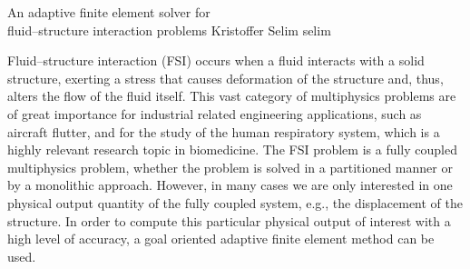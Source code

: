               {An adaptive finite element solver for \\fluid--structure interaction problems}
              {Kristoffer Selim}
              {selim}
\newcommand{\subdt}{\textrm{d}_t}
\newcommand{\divv}{\textrm{div}\;}
\newcommand{\Divv}{\textrm{Div}\;}
\newcommand{\uF}{u_{_{F}}}
\newcommand{\dotuF}{\dot{u}_{_{F}}}
\newcommand{\pF}{p_{_{F}}}
\newcommand{\rhoF}{\rho_{_{F}}}
\newcommand{\sigmaF}{\sigma_{_{F}}}
\newcommand{\sigmaFup}{\sigma_{_{F}}(u_{_{F}}, p_{_{F}})}
\newcommand{\sigmaS}{\sigma_{_{S}}}
\newcommand{\bff}{b_{_{F}}}
\newcommand{\graduF}{\textrm{grad}\;u_{_{F}}}
\newcommand{\US}{U_{_{S}}}
\newcommand{\uS}{u_{_{S}}}
\newcommand{\GradUS}{\textrm{Grad}\;U_{_{S}}}
\newcommand{\ddotUS}{\ddot{U}_{_{S}}}
\newcommand{\ddotuS}{\ddot{u}_{_{S}}}
\newcommand{\PS}{P_{_{S}}}
\newcommand{\rhoS}{\rho_{_{S}}}
\newcommand{\SigmaS}{\Sigma_{_{S}}}
\newcommand{\SigmaSU}{\Sigma_{_{S}}(U_{_{S}})}
\newcommand{\BS}{B_{_{S}}}
\newcommand{\M}{\mathcal{M}}
\newcommand{\E}{\mathcal{E}}
\newcommand{\oF}{\omega_{_{F}}}
\newcommand{\oS}{\omega_{_{S}}}
\newcommand{\OS}{\Omega_{_{S}}}
\newcommand{\OF}{\Omega_{_{F}}}
\newcommand{\PhiS}{\Phi_{_{S}}}
\newcommand{\PhiM}{\Phi_{_{M}}}
\newcommand{\FS}{F_{_{S}}}
\newcommand{\UM}{U_{_{M}}}
\newcommand{\SigmaM}{\Sigma_{_{M}}}
\newcommand{\GradUM}{\textrm{Grad}\;U_{_{M}}}
\newcommand{\UF}{U_{_{F}}}
\newcommand{\PF}{P_{_{F}}}
\newcommand{\AFF}{A_{_{FF}}}
\newcommand{\AFS}{A_{_{FS}}}
\newcommand{\AFM}{A_{_{FM}}}
\newcommand{\ASS}{A_{_{SS}}}
\newcommand{\ASF}{A_{_{SF}}}
\newcommand{\ASM}{A_{_{SM}}}
\newcommand{\AMM}{A_{_{MM}}}
\newcommand{\AMF}{A_{_{MF}}}
\newcommand{\AMS}{A_{_{MS}}}

Fluid--structure interaction (FSI) occurs when a fluid interacts with
a solid structure, exerting a stress that causes deformation of the
structure and, thus, alters the flow of the fluid itself. This vast
category of multiphysics problems are of great importance for
industrial related engineering applications, such as aircraft flutter,
and for the study of the human respiratory system, which is a highly
relevant research topic in biomedicine. The FSI problem is a fully
coupled multiphysics problem, whether the problem is solved in a
partitioned manner or by a monolithic approach. However, in many cases
we are only interested in one physical output quantity of the fully
coupled system, e.g., the displacement of the structure. In order to
compute this particular physical output of interest with a high level
of accuracy, a goal oriented adaptive finite element method can be
used.

